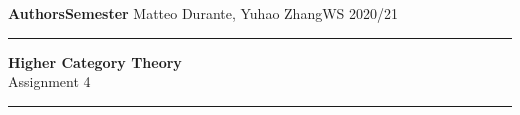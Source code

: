 \documentclass[a4paper,11pt,openany]{scrartcl}
\begin{document}
\noindent\textbf{Authors}\hfill\textbf{Semester} \linebreak
\vspace*{-.1cm} Matteo Durante, Yuhao Zhang\hfill WS 2020/21 \\

\noindent
\rule{\linewidth}{1pt}
\begin{center}
\Large
\textbf{Higher Category Theory} \\
Assignment 4
\end{center}
\rule{\linewidth}{1pt}
\\


\newcommand{\La}{\Lambda}
\newcommand{\pa}{\partial}
\newcommand{\ob}{\operatorname{Ob}}
\newcommand{\mor}{\operatorname{Mor}}
\newcommand{\sto}{\twoheadrightarrow}
\end{document}
